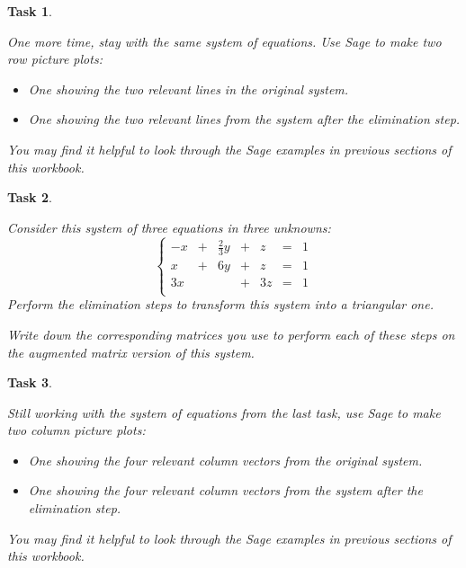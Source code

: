 \documentclass[10pt,]{book}
\theoremstyle{plain}
\numberwithin{equation}{section}
\newtheorem{task}{Task}[chapter]
\begin{document}
\begin{task}
\label{task-51}

      One more time, stay with the same system of equations. Use Sage to make
      two row picture plots:
\begin{itemize}
\item{} One showing the two relevant lines in the original system.\item{} One showing the two relevant lines from the system after the elimination step.\end{itemize}
\par

      You may find it helpful to look through the Sage examples in previous sections
      of this workbook.
\end{task}
\begin{task}
\label{task-52}

      Consider this system of three equations in three unknowns:
      \[
      \left\{
      \begin{array}{rrrrrrr}
      -x &+ &\frac{2}{3} y &+ &z &= &1 \\
       x &+ &           6y &+ &z &= &1 \\
      3x &  &              &+ &3z&= &1 \\
      \end{array}\right.
      \]
      Perform the elimination steps to transform this system into a triangular one.
\par

      Write down the corresponding matrices you use to perform each of these
      steps on the augmented matrix version of this system.
\end{task}
\begin{task}
\label{task-53}

      Still working with the system of equations from the last task, use Sage
      to make two column picture plots:
\begin{itemize}
\item{} One showing the four relevant column vectors from the original system.\item{} One showing the four relevant column vectors from the system after the elimination step.\end{itemize}
\par

      You may find it helpful to look through the Sage examples in previous sections
      of this workbook.
\end{task}
\end{document}
